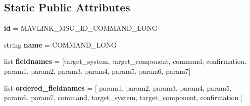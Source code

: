 \subsection*{Static Public Attributes}
\begin{DoxyCompactItemize}
\item 
\mbox{\label{classpymavlink_1_1dialects_1_1v10_1_1MAVLink__command__long__message_a995a7a8123e0bece184fba4560a64dee}} 
{\bfseries id} = M\+A\+V\+L\+I\+N\+K\+\_\+\+M\+S\+G\+\_\+\+I\+D\+\_\+\+C\+O\+M\+M\+A\+N\+D\+\_\+\+L\+O\+NG
\item 
\mbox{\label{classpymavlink_1_1dialects_1_1v10_1_1MAVLink__command__long__message_ae7a1bed7cabf044410f34738473cad86}} 
string {\bfseries name} = \textquotesingle{}C\+O\+M\+M\+A\+N\+D\+\_\+\+L\+O\+NG\textquotesingle{}
\item 
\mbox{\label{classpymavlink_1_1dialects_1_1v10_1_1MAVLink__command__long__message_ab0d8bcb83252250fa873403e8f1c93ba}} 
list {\bfseries fieldnames} = \mbox{[}\textquotesingle{}target\+\_\+system\textquotesingle{}, \textquotesingle{}target\+\_\+component\textquotesingle{}, \textquotesingle{}command\textquotesingle{}, \textquotesingle{}confirmation\textquotesingle{}, \textquotesingle{}param1\textquotesingle{}, \textquotesingle{}param2\textquotesingle{}, \textquotesingle{}param3\textquotesingle{}, \textquotesingle{}param4\textquotesingle{}, \textquotesingle{}param5\textquotesingle{}, \textquotesingle{}param6\textquotesingle{}, \textquotesingle{}param7\textquotesingle{}\mbox{]}
\item 
\mbox{\label{classpymavlink_1_1dialects_1_1v10_1_1MAVLink__command__long__message_a439c730aa1917734ace0a22922a0bb75}} 
list {\bfseries ordered\+\_\+fieldnames} = \mbox{[} \textquotesingle{}param1\textquotesingle{}, \textquotesingle{}param2\textquotesingle{}, \textquotesingle{}param3\textquotesingle{}, \textquotesingle{}param4\textquotesingle{}, \textquotesingle{}param5\textquotesingle{}, \textquotesingle{}param6\textquotesingle{}, \textquotesingle{}param7\textquotesingle{}, \textquotesingle{}command\textquotesingle{}, \textquotesingle{}target\+\_\+system\textquotesingle{}, \textquotesingle{}target\+\_\+component\textquotesingle{}, \textquotesingle{}confirmation\textquotesingle{} \mbox{]}

\end{DoxyCompactItemize}
